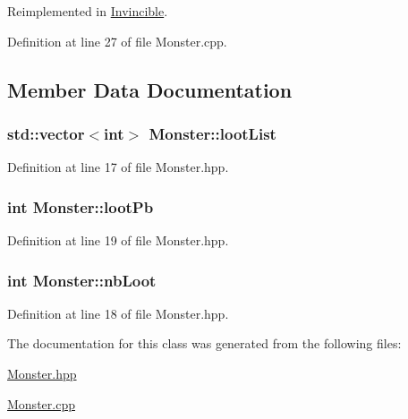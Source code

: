 Reimplemented in \hyperlink{class_invincible_a929bb4a1e2c16aa99553d12d5c7b7c8f}{Invincible}.



Definition at line 27 of file Monster.\-cpp.



\subsection{Member Data Documentation}
\hypertarget{class_monster_ab8b7e80d5929a26ef83d409b557ba1c2}{
\subsubsection[{loot\-List}]{\setlength{\rightskip}{0pt plus 5cm}std\-::vector$<$int$>$ Monster\-::loot\-List\hspace{0.3cm}{\ttfamily [protected]}}}\label{class_monster_ab8b7e80d5929a26ef83d409b557ba1c2}


Definition at line 17 of file Monster.\-hpp.

\hypertarget{class_monster_ac9e9bbb454b38bafdd0a252714708d02}{
\subsubsection[{loot\-Pb}]{\setlength{\rightskip}{0pt plus 5cm}int Monster\-::loot\-Pb\hspace{0.3cm}{\ttfamily [protected]}}}\label{class_monster_ac9e9bbb454b38bafdd0a252714708d02}


Definition at line 19 of file Monster.\-hpp.

\hypertarget{class_monster_a4fad5b269c9e61070b7ab149edd7ec0d}{
\subsubsection[{nb\-Loot}]{\setlength{\rightskip}{0pt plus 5cm}int Monster\-::nb\-Loot\hspace{0.3cm}{\ttfamily [protected]}}}\label{class_monster_a4fad5b269c9e61070b7ab149edd7ec0d}


Definition at line 18 of file Monster.\-hpp.



The documentation for this class was generated from the following files\-:\begin{DoxyCompactItemize}
\item 
\hyperlink{_monster_8hpp}{Monster.\-hpp}\item 
\hyperlink{_monster_8cpp}{Monster.\-cpp}\end{DoxyCompactItemize}
